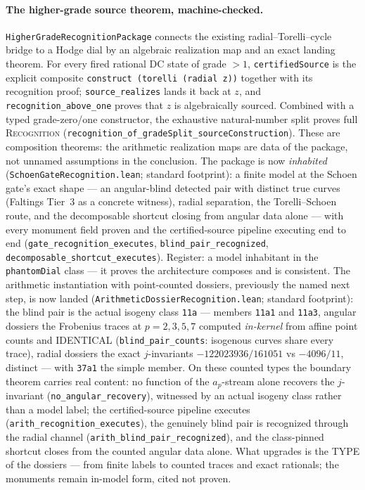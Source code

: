 \documentclass[11pt]{article}
\theoremstyle{definition}
\theoremstyle{remark}
\begin{document}
\paragraph{The higher-grade source theorem, machine-checked.}
\texttt{HigherGradeRecognitionPackage} connects the existing
radial--Torelli--cycle bridge to a Hodge dial by an algebraic realization map
and an exact landing theorem. For every fired rational DC state of grade
$>1$, \texttt{certifiedSource} is the explicit composite
\texttt{construct (torelli (radial z))} together with its recognition proof;
\texttt{source\_realizes} lands it back at $z$, and
\texttt{recognition\_above\_one} proves that $z$ is algebraically sourced.
Combined with a typed grade-zero/one constructor, the exhaustive natural-number
split proves full \textsc{Recognition}
(\texttt{recognition\_of\_gradeSplit\_sourceConstruction}). These are
composition theorems: the arithmetic realization maps are data of the package,
not unnamed assumptions in the conclusion.  The package is now
\emph{inhabited} (\texttt{SchoenGateRecognition.lean}; standard
footprint): a finite model at the Schoen gate's exact shape --- an
angular-blind detected pair with distinct true curves (Faltings Tier~3 as
a concrete witness), radial separation, the Torelli--Schoen route, and
the decomposable shortcut closing from angular data alone --- with every
monument field proven and the certified-source pipeline executing end to
end (\texttt{gate\_recognition\_executes},
\texttt{blind\_pair\_recognized},
\texttt{decomposable\_shortcut\_executes}).  Register: a model inhabitant
in the \texttt{phantomDial} class --- it proves the architecture composes
and is consistent.  The arithmetic instantiation with point-counted
dossiers, previously the named next step, is now landed
(\texttt{ArithmeticDossierRecognition.lean}; standard footprint): the
blind pair is the actual isogeny class \texttt{11a} --- members
\texttt{11a1} and \texttt{11a3}, angular dossiers the Frobenius traces at
$p=2,3,5,7$ computed \emph{in-kernel} from affine point counts and
IDENTICAL (\texttt{blind\_pair\_counts}: isogenous curves share every
trace), radial dossiers the exact $j$-invariants
$-122023936/161051$ vs $-4096/11$, distinct --- with \texttt{37a1} the
simple member.  On these counted types the boundary theorem carries real
content: no function of the $a_p$-stream alone recovers the
$j$-invariant (\texttt{no\_angular\_recovery}), witnessed by an actual
isogeny class rather than a model label; the certified-source pipeline
executes (\texttt{arith\_recognition\_executes}), the genuinely blind
pair is recognized through the radial channel
(\texttt{arith\_blind\_pair\_recognized}), and the class-pinned shortcut
closes from the counted angular data alone.  What upgrades is the TYPE of
the dossiers --- from finite labels to counted traces and exact
rationals; the monuments remain in-model form, cited not proven.
\end{document}
